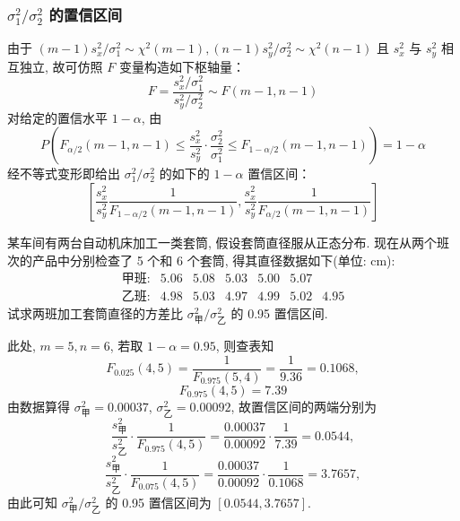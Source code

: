 \subsubsection{$\sigma_1^2/\sigma_2^2$ 的置信区间}

由于 $(m-1)s_x^2/\sigma_1^2\sim\chi^2(m-1),(n-1)s_y^2/\sigma_2^2\sim\chi^2(n-1)$ 且 $s_x^2$ 与 $s_y^2$ 相互独立, 故可仿照 $F$ 变量构造如下枢轴量：
\[F=\frac{s_x^2/\sigma_1^2}{s_y^2/\sigma_2^2}\sim F(m-1,n-1)\]
对给定的置信水平 $1-\alpha$, 由
\[P\left(F_{\alpha/2}(m-1,n-1)\leqslant\frac{s_x^2}{s_y^2}\cdot\frac{\sigma_2^2}{\sigma_1^2}\leqslant F_{1-\alpha/2}(m-1,n-1)\right)=1-\alpha\]
经不等式变形即给出 $\sigma_1^2/\sigma_2^2$ 的如下的 $1-\alpha$ 置信区间：
\[\left[\frac{s_x^2}{s_y^2}\frac{1}{F_{1-\alpha/2}(m-1,n-1)},\frac{s_x^2}{s_y^2}\frac{1}{F_{\alpha/2}(m-1,n-1)}\right]\]

\begin{example}\label{exam:6.5.10}
某车间有两台自动机床加工一类套筒, 假设套筒直径服从正态分布. 现在从两个班次的产品中分别检查了 5 个和 6 个套筒, 得其直径数据如下(单位: cm):
\[\begin{array}{ccccccc}
\text{甲班}: & 5.06 & 5.08 & 5.03 & 5.00 & 5.07 &\\
\text{乙班}: & 4.98 & 5.03 & 4.97 & 4.99 & 5.02 & 4.95
\end{array}\]
试求两班加工套筒直径的方差比 $\sigma_{\text{甲}}^2/\sigma_{\text{乙}}^2$ 的 0.95 置信区间.
\end{example}\begin{solution}
此处, $m=5,n=6$, 若取 $1-\alpha=0.95$, 则查表知
\[F_{0.025}(4,5)=\frac{1}{F_{0.975}(5,4)}=\frac{1}{9.36}=0.1068,\]
\[F_{0.975}(4,5)=7.39\]
由数据算得 $\sigma_{\text{甲}}^2=0.00037$, $\sigma_{\text{乙}}^2=0.00092$, 故置信区间的两端分别为
\[\frac{s_{\text{甲}}^2}{s_{\text{乙}}^2}\cdot\frac{1}{F_{0.975}(4,5)}=\frac{0.00037}{0.00092}\cdot\frac{1}{7.39}=0.0544,\]
\[\frac{s_{\text{甲}}^2}{s_{\text{乙}}^2}\cdot\frac{1}{F_{0.075}(4,5)}=\frac{0.00037}{0.00092}\cdot\frac{1}{0.1068}=3.7657,\]
由此可知 $\sigma_{\text{甲}}^2/\sigma_{\text{乙}}^2$ 的 0.95 置信区间为 $[0.0544, 3.7657]$.
\end{solution}

